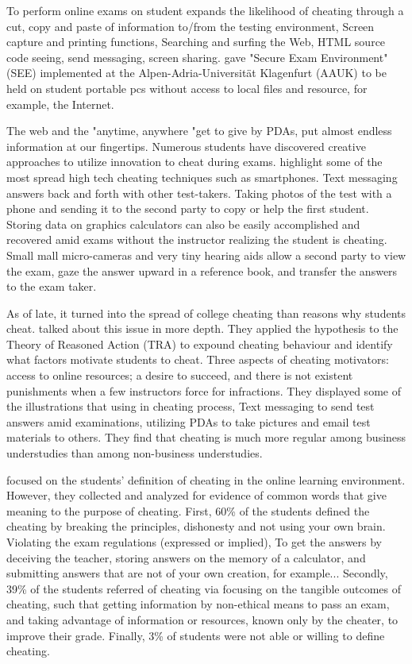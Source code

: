 To perform online exams on student expands the likelihood of cheating through a cut, copy and paste of information to/from the testing environment, Screen capture and printing functions, Searching and surfing the Web, HTML source code seeing, send messaging, screen sharing.
 gave "Secure Exam Environment" (SEE) implemented at the Alpen-Adria-Universität Klagenfurt (AAUK) to be held on student portable pcs without access to local files and resource, for example, the Internet.

The web and the "anytime, anywhere "get to give by PDAs, put almost endless information at our fingertips.
Numerous students have discovered creative approaches to utilize innovation to cheat during exams.
 highlight some of the most spread high tech cheating techniques such as smartphones.
Text messaging answers back and forth with other test-takers.
Taking photos of the test with a phone and sending it to the second party to copy or help the first student.
Storing data on graphics calculators can also be easily accomplished and recovered amid exams without the instructor realizing the student is cheating.
Small mall micro-cameras and very tiny hearing aids allow a second party to view the exam, gaze the answer upward in a reference book, and transfer the answers to the exam taker.

As of late, it turned into the spread of college cheating than reasons why students cheat.
 talked about this issue in more depth.
They applied the hypothesis to the Theory of Reasoned Action (TRA) to expound cheating behaviour and identify what factors motivate students to cheat.
Three aspects of cheating motivators: access to online resources; a desire to succeed, and there is not existent punishments when a few instructors force for infractions.
They displayed some of the illustrations that using in cheating process, Text messaging to send test answers amid examinations, utilizing PDAs to take pictures and email test materials to others.
They find that cheating is much more regular among business understudies than among non-business understudies.

 focused on the students' definition of cheating in the online learning environment.
However, they collected and analyzed for evidence of common words that give meaning to the purpose of cheating.
First, 60\% of the students defined the cheating by breaking the principles, dishonesty and not using your own brain.
Violating the exam regulations (expressed or implied), To get the answers by deceiving the teacher, storing answers on the memory of a calculator, and submitting answers that are not of your own creation, for example...
Secondly, 39\% of the students referred of cheating via focusing on the tangible outcomes of cheating, such that getting information by non-ethical means to pass an exam, and taking advantage of information or resources, known only by the cheater, to improve their grade.
Finally, 3\% of students were not able or willing to define cheating.

